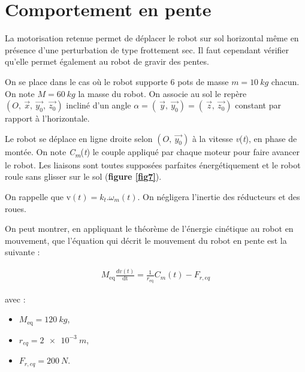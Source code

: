 \section{Comportement en pente}\label{iii.2---comportement-en-pente}

La motorisation retenue permet de déplacer le robot sur sol horizontal
même en présence d'une perturbation de type frottement sec. Il faut
cependant vérifier qu'elle permet également au robot de gravir des
pentes.



On se place dans le cas où le robot supporte 6 pots de masse $m=\SI{10}{kg}$ chacun. On note $M = \SI{60}{kg}$ la masse du robot. On associe au sol le repère
\((O,\ \overrightarrow{x},\ \overrightarrow{y_{0}},\ \overrightarrow{z_{0}})\)
incliné d'un angle \(\alpha = \left( \ \overrightarrow{y},\ \overrightarrow{y_{0}} \right) = \left( \ \overrightarrow{z},\ \overrightarrow{z_{0}} \right)\)
constant par rapport à l'horizontale.

Le robot se déplace en ligne droite selon
\((O,\ \overrightarrow{y_{0}})\) à la vitesse \emph{v}(\emph{t}), en
phase de montée. On note \emph{C\textsubscript{m}}(\emph{t}) le couple
appliqué par chaque moteur pour faire avancer le robot. Les liaisons
sont toutes supposées parfaites énergétiquement et le robot roule sans
glisser sur le sol (\textbf{figure \ref{fig7}}).



On rappelle que\(\text{\ v}\left( t \right) = k_{t}.\omega_{m}\left( t \right)\). On
négligera l'inertie des réducteurs et des roues.

On peut montrer, en appliquant le théorème de l'énergie cinétique
au robot en mouvement, que l'équation qui décrit le mouvement du robot
en pente est la suivante :

\begin{align*}
M_{\text{eq}}\frac{dv(t)}{\text{dt}} = \frac{1}{r_{\text{eq}}}C_{m}\left( t \right) - F_{r,eq}
\end{align*}

avec : 

\begin{itemize}
\item $M_{\text{eq}}=\SI{120}{kg}$,
\item $r_{eq} =\SI{2e-3}{m}$,
\item $F_{r,eq}= \SI{200}{N}$.
\end{itemize}

